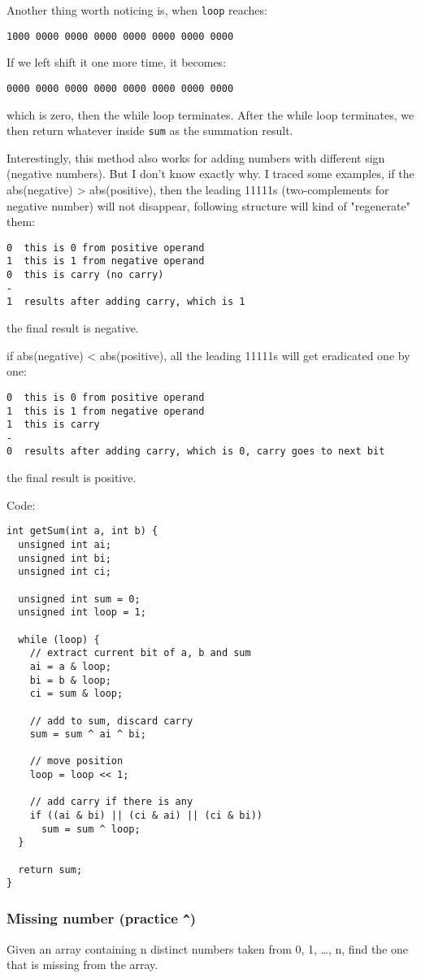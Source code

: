 \documentclass[12pt]{article}
\begin{document}
Another thing worth noticing is, when \texttt{loop} reaches:
\begin{verbatim}
1000 0000 0000 0000 0000 0000 0000 0000
\end{verbatim}
If we left shift it one more time, it becomes:
\begin{verbatim}
0000 0000 0000 0000 0000 0000 0000 0000
\end{verbatim}
which is zero, then the while loop terminates. After the while loop terminates, we then return whatever inside \texttt{sum} as the summation result.

Interestingly, this method also works for adding numbers with different sign (negative numbers). But I don't know exactly why. I traced some examples, if the abs(negative) > abs(positive), then the leading 11111s (two-complements for negative number) will not disappear, following structure will kind of "regenerate" them:
\begin{verbatim}
0  this is 0 from positive operand
1  this is 1 from negative operand
0  this is carry (no carry)
-
1  results after adding carry, which is 1
\end{verbatim}
the final result is negative.

if abs(negative) < abs(positive), all the leading 11111s will get eradicated one by one:
\begin{verbatim}
0  this is 0 from positive operand
1  this is 1 from negative operand
1  this is carry
-
0  results after adding carry, which is 0, carry goes to next bit
\end{verbatim}
the final result is positive.

Code:
\begin{verbatim}
int getSum(int a, int b) {
  unsigned int ai;
  unsigned int bi;
  unsigned int ci;

  unsigned int sum = 0;
  unsigned int loop = 1;

  while (loop) {
    // extract current bit of a, b and sum
    ai = a & loop;
    bi = b & loop;
    ci = sum & loop;

    // add to sum, discard carry
    sum = sum ^ ai ^ bi;

    // move position
    loop = loop << 1;

    // add carry if there is any
    if ((ai & bi) || (ci & ai) || (ci & bi))
      sum = sum ^ loop;
  }

  return sum;    
}
\end{verbatim}
\subsubsection{Missing number (practice \texttt{\textasciicircum{}})}
\label{sec:orgca5bd71}
Given an array containing n distinct numbers taken from 0, 1, \ldots{}, n, find the one that is missing from the array.
\end{document}
